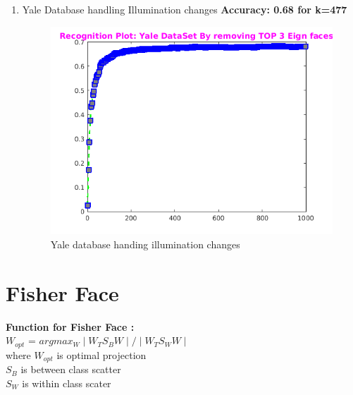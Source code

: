 \documentclass[a4paper,10pt]{report}
\begin{document}
\begin{enumerate}
\item Yale Database handling Illumination changes
 \newline
 \textbf{Accuracy: 0.68 for k=477 }\\

\begin{figure}[h]
	\centering
	\includegraphics[scale=.6]{eigenYaleIllumination.png}
	\caption{Yale database handing illumination changes}
	\label{fig.c}
\end{figure}
\end{enumerate}
\newpage

\section{Fisher Face}

\textbf{ Function for Fisher Face :} \\
$W_{opt}$ = $argmax_W  \mid W_T S_B W \mid / \mid W_T S_W W \mid $\\
where $W_{opt}$ is optimal projection \\
      $S_B$ is between class scatter \\
      $S_W$ is within class scater \\

\newline
\end{document}
